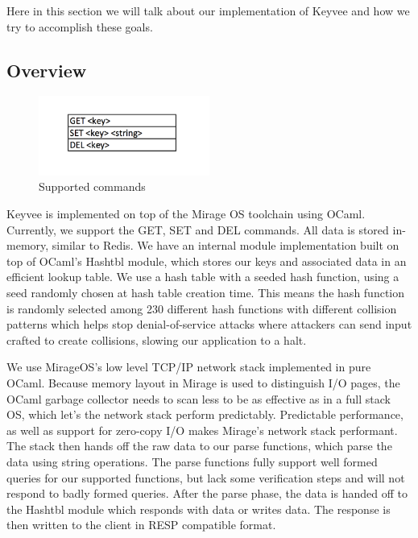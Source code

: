 \documentclass[english,10pt,twocolumn]{article}
\begin{document}
Here in this section we will talk about our implementation of Keyvee and how we try to accomplish these goals.

\subsection{Overview}



\begin{figure}[ht]
  \centering
  \caption{Supported commands}
  \includegraphics[width=0.5\textwidth]{images/commands}
\end{figure}

Keyvee is implemented on top of the Mirage OS toolchain using OCaml.
Currently, we support the GET, SET and DEL commands.
All data is stored in-memory, similar to Redis.
We have an internal module implementation built on top of OCaml's Hashtbl module, which stores our keys and associated data in an efficient lookup table.
We use a hash table with a seeded hash function, using a seed randomly chosen at hash table creation time.
This means the hash function is randomly selected among 230 different hash functions with different collision patterns which helps stop denial-of-service attacks where attackers can send input crafted to create collisions, slowing our application to a halt.

We use MirageOS's low level TCP/IP network stack implemented in pure OCaml.
Because memory layout in Mirage is used to distinguish I/O pages, the OCaml garbage collector needs to scan less to be as effective as in a full stack OS, which let's the network stack perform predictably.
Predictable performance, as well as support for zero-copy I/O makes Mirage's network stack performant.
The stack then hands off the raw data to our parse functions, which parse the data using string operations.
The parse functions fully support well formed queries for our supported functions, but lack some verification steps and will not respond to badly formed queries.
After the parse phase, the data is handed off to the Hashtbl module which responds with data or writes data.
The response is then written to the client in RESP compatible format.
\end{document}
